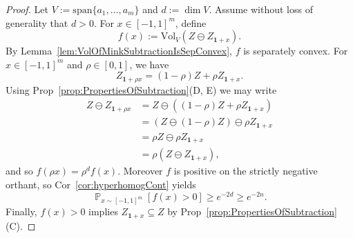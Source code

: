 \documentclass[12pt,english]{article}
\theoremstyle{theorem}
\theoremstyle{remark}
\newcommand{\Vol}{\mathrm{Vol}}
\renewcommand{\span}{\textrm{span}}
\renewcommand{\Pr}{\mathop{\mathbb{P}}}
\begin{document}
\begin{proof}
Let $V:=\span\{a_1,\ldots,a_m\}$ and $d:=\dim V$. Assume without loss of generality that $d > 0$. For $x\in[-1,1]^m$, define
\[
f(x):=\Vol_V(Z\ominus Z_{\bm{1}+x}).
\]
By Lemma~\ref{lem:VolOfMinkSubtractionIsSepConvex}, $f$ is separately convex.
For $x \in [-1,1]^m$ and $\rho\in [0,1]$, we have
\[
Z_{\bm{1}+\rho x}
=(1-\rho)Z+\rho Z_{\bm{1}+x}.
\]
Using Prop~\ref{prop:PropertiesOfSubtraction}(D, E) we may write
\[
\begin{aligned}
Z \ominus Z_{\bm{1}+\rho x}
  &= Z \ominus ((1-\rho)Z+\rho Z_{\bm{1}+x}) \\
  &= (Z \ominus (1-\rho)Z) \ominus \rho Z_{\bm{1}+x} \\
  &= \rho Z \ominus \rho Z_{\bm{1}+x} \\
  &= \rho (Z \ominus Z_{\bm{1}+x}),
\end{aligned}
\]
and so $f(\rho x)=\rho^d f(x)$. Moreover $f$ is positive on the strictly negative orthant, %
so Cor~\ref{cor:hyperhomogCont}  yields
\[
\Pr_{x\sim[-1,1]^m}[f(x)>0]
\geq e^{-2d}\geq e^{-2n}.
\]
Finally, $f(x)>0$ implies $Z_{\bm{1}+x}\subseteq Z$ by
Prop~\ref{prop:PropertiesOfSubtraction}(C). 
\end{proof}
\end{document}
